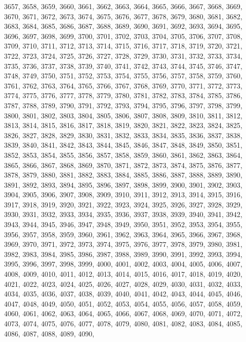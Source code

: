 3657,
3658,
3659,
3660,
3661,
3662,
3663,
3664,
3665,
3666,
3667,
3668,
3669,
3670,
3671,
3672,
3673,
3674,
3675,
3676,
3677,
3678,
3679,
3680,
3681,
3682,
3683,
3684,
3685,
3686,
3687,
3688,
3689,
3690,
3691,
3692,
3693,
3694,
3695,
3696,
3697,
3698,
3699,
3700,
3701,
3702,
3703,
3704,
3705,
3706,
3707,
3708,
3709,
3710,
3711,
3712,
3713,
3714,
3715,
3716,
3717,
3718,
3719,
3720,
3721,
3722,
3723,
3724,
3725,
3726,
3727,
3728,
3729,
3730,
3731,
3732,
3733,
3734,
3735,
3736,
3737,
3738,
3739,
3740,
3741,
3742,
3743,
3744,
3745,
3746,
3747,
3748,
3749,
3750,
3751,
3752,
3753,
3754,
3755,
3756,
3757,
3758,
3759,
3760,
3761,
3762,
3763,
3764,
3765,
3766,
3767,
3768,
3769,
3770,
3771,
3772,
3773,
3774,
3775,
3776,
3777,
3778,
3779,
3780,
3781,
3782,
3783,
3784,
3785,
3786,
3787,
3788,
3789,
3790,
3791,
3792,
3793,
3794,
3795,
3796,
3797,
3798,
3799,
3800,
3801,
3802,
3803,
3804,
3805,
3806,
3807,
3808,
3809,
3810,
3811,
3812,
3813,
3814,
3815,
3816,
3817,
3818,
3819,
3820,
3821,
3822,
3823,
3824,
3825,
3826,
3827,
3828,
3829,
3830,
3831,
3832,
3833,
3834,
3835,
3836,
3837,
3838,
3839,
3840,
3841,
3842,
3843,
3844,
3845,
3846,
3847,
3848,
3849,
3850,
3851,
3852,
3853,
3854,
3855,
3856,
3857,
3858,
3859,
3860,
3861,
3862,
3863,
3864,
3865,
3866,
3867,
3868,
3869,
3870,
3871,
3872,
3873,
3874,
3875,
3876,
3877,
3878,
3879,
3880,
3881,
3882,
3883,
3884,
3885,
3886,
3887,
3888,
3889,
3890,
3891,
3892,
3893,
3894,
3895,
3896,
3897,
3898,
3899,
3900,
3901,
3902,
3903,
3904,
3905,
3906,
3907,
3908,
3909,
3910,
3911,
3912,
3913,
3914,
3915,
3916,
3917,
3918,
3919,
3920,
3921,
3922,
3923,
3924,
3925,
3926,
3927,
3928,
3929,
3930,
3931,
3932,
3933,
3934,
3935,
3936,
3937,
3938,
3939,
3940,
3941,
3942,
3943,
3944,
3945,
3946,
3947,
3948,
3949,
3950,
3951,
3952,
3953,
3954,
3955,
3956,
3957,
3958,
3959,
3960,
3961,
3962,
3963,
3964,
3965,
3966,
3967,
3968,
3969,
3970,
3971,
3972,
3973,
3974,
3975,
3976,
3977,
3978,
3979,
3980,
3981,
3982,
3983,
3984,
3985,
3986,
3987,
3988,
3989,
3990,
3991,
3992,
3993,
3994,
3995,
3996,
3997,
3998,
3999,
4000,
4001,
4002,
4003,
4004,
4005,
4006,
4007,
4008,
4009,
4010,
4011,
4012,
4013,
4014,
4015,
4016,
4017,
4018,
4019,
4020,
4021,
4022,
4023,
4024,
4025,
4026,
4027,
4028,
4029,
4030,
4031,
4032,
4033,
4034,
4035,
4036,
4037,
4038,
4039,
4040,
4041,
4042,
4043,
4044,
4045,
4046,
4047,
4048,
4049,
4050,
4051,
4052,
4053,
4054,
4055,
4056,
4057,
4058,
4059,
4060,
4061,
4062,
4063,
4064,
4065,
4066,
4067,
4068,
4069,
4070,
4071,
4072,
4073,
4074,
4075,
4076,
4077,
4078,
4079,
4080,
4081,
4082,
4083,
4084,
4085,
4086,
4087,
4088,
4089,
4090,
